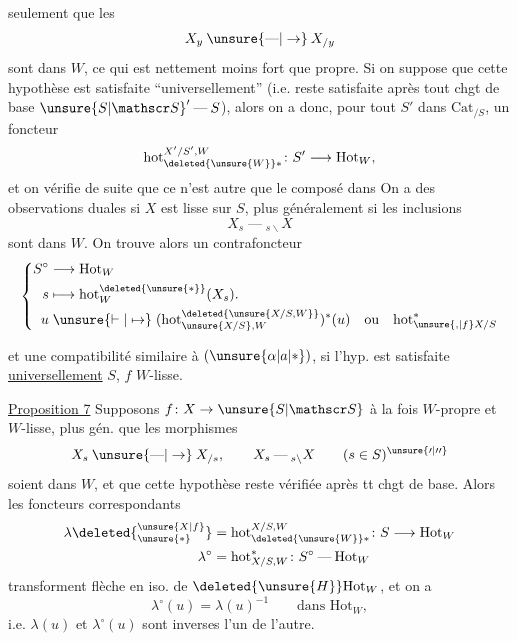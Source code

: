 seulement que les
\[
X_y\mathbin{\unsure{\text{---}|\to}}X_{/y}
\]
sont dans $W$, ce qui est nettement moins fort que propre. Si on suppose que cette hypothèse est
satisfaite ``universellement'' (i.e. reste satisfaite après tout chgt de base $\unsure{S|\mathscr S}'\mathbin{\text{---}}S$), alors on a donc, pour tout $S'$ dans $\mathrm{Cat}_{/S}$, un  foncteur
\[
\mathrm{hot}^{X'/S',W}_{\deleted{\unsure{W}}*}\colon S'\longrightarrow\mathrm{Hot}_W,
\]
et on vérifie  de suite que ce n'est autre que le composé dans
On a des observations duales si $X$ est lisse sur $S$, plus généralement si les inclusions
\[
X_s\mathbin{\text{---}}{}_{s\backslash}X
\]
sont dans $W$. On trouve alors un contrafoncteur
\[
\left\{\begin{aligned}
S^\circ&\longrightarrow \mathrm{Hot}_W\\
s&\longmapsto\mathrm{hot}_W^{\deleted{\unsure{*}}}(X_s).\\
u&\mathrel{\unsure{\vdash|\mapsto}}(\mathrm{hot}^{\deleted{\unsure{X/S,W}}}_{\unsure{X/S},W})^*(u)\quad\text{ou}\quad\mathrm{hot}_{\unsure{,|f}X/S}^{*}
\end{aligned}\right.
\]


et une compatibilité similaire à $(\unsure{\alpha|a|*})$, si l'hyp. est satisfaite \uline{universellement}  $S$,  $f$ $W$-lisse.

\uline{Proposition 7} Supposons $f\colon X\to\unsure{S|\mathscr S}$ à la fois $W$-propre et $W$-lisse, plus gén. que les morphismes
\[
X_s\mathbin{\unsure{\text{---}|\to}}X_{/s},\qquad X_s\mathbin{\text{---}}{}_{s\backslash}X\qquad(s\in S)^{\unsure{\prime|\prime\prime}}
\]
soient dans $W$, et que cette hypothèse reste vérifiée après tt chgt de base. Alors les foncteurs correspondants
\[
\begin{aligned}
\lambda\deleted{^{\unsure{X|f}}_{\unsure{*}}}&=\mathrm{hot}^{X/S,W}_{\deleted{\unsure{W}}*}\colon S\longrightarrow\mathrm{Hot}_W\\
\lambda^\circ&=\mathrm{hot}_{X/S,W}^{*}\colon S^\circ\mathbin{\text{---}}\mathrm{Hot}_W
\end{aligned}
\]
transforment  flèche  en iso. de $\deleted{\unsure{H}}\mathrm{Hot}_W$, et on a
\[
\lambda^\circ(u)=\lambda(u)^{-1}\qquad\text{dans }\mathrm{Hot}_W,
\]
i.e. $\lambda(u)$ et $\lambda^\circ(u)$ sont inverses l'un de l'autre.

